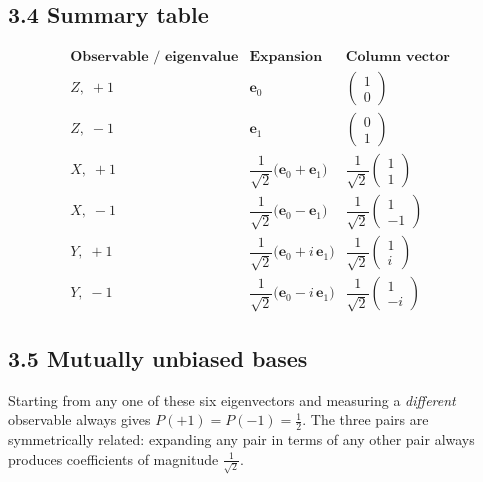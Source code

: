 \documentclass[12pt,a4paper]{article}
\begin{document}
\subsection{3.4 Summary table}
\[
\renewcommand{\arraystretch}{1.4}
\begin{array}{c|c|c}
\textbf{Observable / eigenvalue} & \textbf{Expansion} & \textbf{Column vector} \\\hline
Z,\;+1 & \mathbf{e}_0 & \begin{pmatrix}1\\0\end{pmatrix} \\[4pt]
Z,\;-1 & \mathbf{e}_1 & \begin{pmatrix}0\\1\end{pmatrix} \\[4pt]
X,\;+1 & \dfrac{1}{\sqrt{2}}\bigl(\mathbf{e}_0+\mathbf{e}_1\bigr) & \dfrac{1}{\sqrt{2}}\begin{pmatrix}1\\1\end{pmatrix} \\[4pt]
X,\;-1 & \dfrac{1}{\sqrt{2}}\bigl(\mathbf{e}_0-\mathbf{e}_1\bigr) & \dfrac{1}{\sqrt{2}}\begin{pmatrix}1\\-1\end{pmatrix} \\[4pt]
Y,\;+1 & \dfrac{1}{\sqrt{2}}\bigl(\mathbf{e}_0+i\,\mathbf{e}_1\bigr) & \dfrac{1}{\sqrt{2}}\begin{pmatrix}1\\i\end{pmatrix} \\[4pt]
Y,\;-1 & \dfrac{1}{\sqrt{2}}\bigl(\mathbf{e}_0-i\,\mathbf{e}_1\bigr) & \dfrac{1}{\sqrt{2}}\begin{pmatrix}1\\-i\end{pmatrix}
\end{array}
\]

\subsection{3.5 Mutually unbiased bases}
Starting from any one of these six eigenvectors and measuring a \emph{different} observable always gives $P(+1)=P(-1)=\tfrac{1}{2}$.  The three pairs are symmetrically related: expanding any pair in terms of any other pair always produces coefficients of magnitude $\frac{1}{\sqrt{2}}$.
\end{document}
